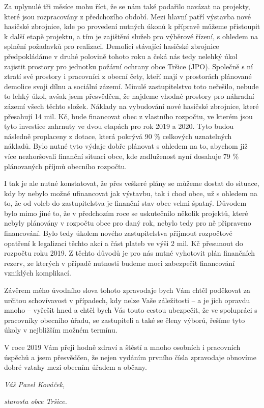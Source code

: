 \documentclass[11pt]{article}
\begin{document}
\begin{multicols}{3}
{Za uplynulé tři měsíce mohu říct, že se nám také podařilo navázat na projekty, které jsou rozpracovány z předchozího období. Mezi hlavní patří výstavba nové hasičské zbrojnice, kde po provedení nutných úkonů k přípravě můžeme přistoupit k další etapě projektu, a tím je zajištění služeb pro výběrové řízení, s ohledem na splnění požadavků pro realizaci. Demolici stávající hasičské zbrojnice předpokládáme v druhé polovině tohoto roku a čeká nás tedy nelehký úkol zajistit prostory pro jednotku požární ochrany obce Tršice (JPO). Společně s ní ztratí své prostory i pracovníci z obecní čety, kteří mají v prostorách plánované demolice svoji dílnu a sociální zázemí. Minulé zastupitelstvo toto neřešilo, nebude to lehký úkol, avšak jsem přesvědčen, že najdeme vhodné prostory pro náhradní zázemí všech těchto složek. Náklady na vybudování nové hasičské zbrojnice, které přesahují 14 mil. Kč, bude financovat obec z vlastního rozpočtu, ve kterém jsou tyto investice zahrnuty ve dvou etapách pro rok 2019 a 2020. Tyto budou následně proplaceny z dotace, která pokrývá 90 \% celkových uznatelných nákladů. Bylo nutné tyto výdaje dobře plánovat s ohledem na to, abychom již více nezhoršovali finanční situaci obce, kde zadluženost nyní dosahuje 79 \% plánovaných příjmů obecního rozpočtu.

I tak je ale nutné konstatovat, že přes veškeré plány se můžeme dostat do situace, kdy by nebylo možné ufinancovat jak výstavbu, tak i chod obce, už s ohledem na to, že od voleb do zastupitelstva je finanční stav obce velmi špatný. Důvodem bylo mimo jiné to, že v předchozím roce se uskutečnilo několik projektů, které nebyly plánovány v rozpočtu obce pro daný rok, nebylo tedy pro ně připraveno financování. Bylo tedy úkolem nového zastupitelstva přijmout rozpočtové opatření k legalizaci těchto akcí a část plateb ve výši 2 mil. Kč přesunout do rozpočtu roku 2019. Z těchto důvodů je pro nás nutné vyhotovit plán finančních rezerv, ze kterých v případě nutnosti budeme moci zabezpečit financování vzniklých komplikací.

Závěrem mého úvodního slova tohoto zpravodaje bych Vám chtěl poděkovat za určitou schovívavost v případech, kdy nelze Vaše záležitosti – a je jich opravdu mnoho – vyřešit hned a chtěl bych Vás touto cestou ubezpečit, že ve spolupráci s pracovníky obecního úřadu, se zastupiteli a také se členy výborů, řešíme tyto úkoly v nejbližším možném termínu.

V roce 2019 Vám přeji hodně zdraví a štěstí a mnoho osobních i pracovních úspěchů a jsem přesvědčen, že nejen vydáním prvního čísla zpravodaje obnovíme dobré vztahy mezi obecním úřadem a občany.

\emph{Váš Pavel Kováček,}

\emph{starosta obce Tršice.}
}\end{multicols}
\end{document}
